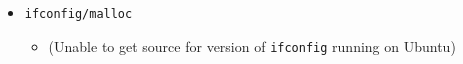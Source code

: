\begin{itemize}
\begin{itemize}
\begin{lstlisting}
\end{lstlisting}
\end{itemize}

\item \texttt{ifconfig/malloc}
\begin{itemize}
\item (Unable to get source for version of \texttt{ifconfig} running on Ubuntu)\\
\end{itemize}


\end{itemize}
